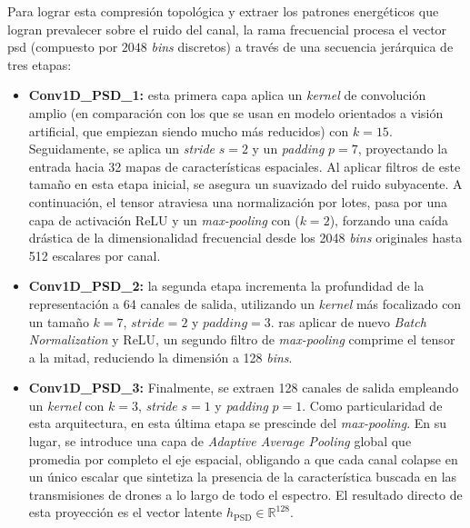 Para lograr esta compresión topológica y extraer los patrones energéticos que logran prevalecer sobre el ruido del canal, la rama frecuencial procesa el vector \gls{psd} (compuesto por $2048$ \textit{bins} discretos) a través de una secuencia jerárquica de tres etapas:
\begin{itemize}
    \item \textbf{Conv1D\_PSD\_1:} esta primera capa aplica un \textit{kernel} de convolución amplio (en comparación con los que se usan en modelo orientados a visión artificial, que empiezan siendo mucho más reducidos) con $k=15$. Seguidamente, se aplica un \textit{stride} $s=2$ y un \textit{padding} $p=7$, proyectando la entrada hacia 32 mapas de características espaciales. Al aplicar filtros de este tamaño en esta etapa inicial, se asegura un suavizado del ruido subyacente. A continuación, el tensor atraviesa una normalización por lotes, pasa por una capa de activación ReLU y un \textit{max-pooling} con ($k=2$), forzando una caída drástica de la dimensionalidad frecuencial desde los 2048 \textit{bins} originales hasta 512 escalares por canal.
    
    \item \textbf{Conv1D\_PSD\_2:} la segunda etapa incrementa la profundidad de la representación a 64 canales de salida, utilizando un \textit{kernel} más focalizado con un tamaño $k=7$, $stride=2$ y $padding=3$. ras aplicar de nuevo \textit{Batch Normalization} y ReLU, un segundo filtro de \textit{max-pooling} comprime el tensor a la mitad, reduciendo la dimensión a 128 \textit{bins}.
    
    \item \textbf{Conv1D\_PSD\_3:} Finalmente, se extraen 128 canales de salida empleando un \textit{kernel} con $k=3$, \textit{stride} $s=1$ y \textit{padding} $p=1$. Como particularidad de esta arquitectura, en esta última etapa se prescinde del \textit{max-pooling}. En su lugar, se introduce una capa de \textit{Adaptive Average Pooling} global que promedia por completo el eje espacial, obligando a que cada canal colapse en un único escalar que sintetiza la presencia de la característica buscada en las transmisiones de drones a lo largo de todo el espectro. El resultado directo de esta proyección es el vector latente $h_{\text{PSD}} \in \mathbb{R}^{128}$.
\end{itemize}

